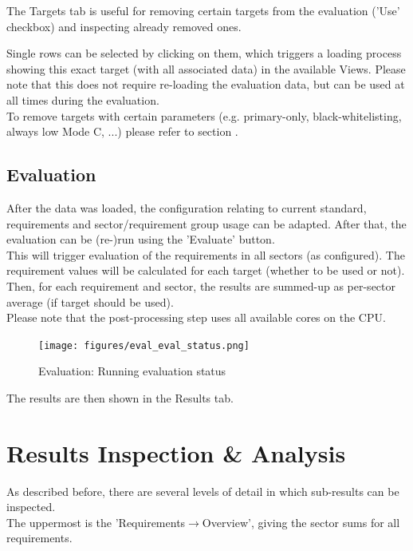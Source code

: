 The Targets tab is useful for removing certain targets from the evaluation ('Use' checkbox) and inspecting already removed ones. 

Single rows can be selected by clicking on them, which triggers a loading process showing this exact target (with all associated data) in the available Views. Please note that this does not require re-loading the evaluation data, but can be used at all times during the evaluation. \\

To remove targets with certain parameters (e.g. primary-only, black-whitelisting, always low Mode C, ...) please refer to section .

\subsection{Evaluation}
\label{sec:eval_run_eval} 

After the data was loaded, the configuration relating to current standard, requirements and sector/requirement group usage can be adapted. After that, the evaluation can be (re-)run using the 'Evaluate' button. \\

This will trigger evaluation of the requirements in all sectors (as configured). The requirement values will be calculated for each target (whether to be used or not). Then, for each requirement and sector, the results are summed-up as per-sector average (if target should be used). \\

Please note that the post-processing step uses all available cores on the CPU.

\begin{figure}[H]
  \centering 
    \texttt{[image: figures/eval\_eval\_status.png]}
  \caption{Evaluation: Running evaluation status}
\end{figure}

The results are then shown in the Results tab.

\section{Results Inspection \& Analysis}
\label{sec:eval_inspect}

As described before, there are several levels of detail in which sub-results can be inspected.\\

The uppermost is the 'Requirements$\rightarrow$Overview', giving the sector sums for all requirements. \\

